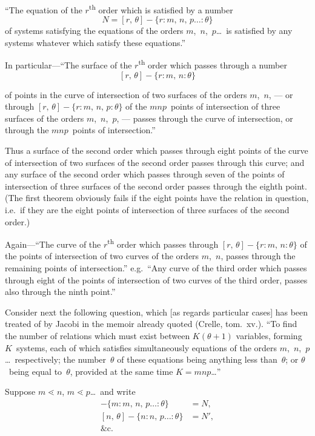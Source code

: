 \documentclass[11pt,a4paper]{book}
\begin{document}
``The equation of the $r$\textsuperscript{th} order which is satisfied by a number
\[
N = [r,\,\theta] - \{r : m,\, n,\, p\ldots : \theta\}
\]
of systems satisfying the equations of the orders $m$,~$n$,~$p$\ldots\ is satisfied by any systems whatever which satisfy these equations.''

In particular---``The surface of the $r$\textsuperscript{th} order which passes through a number
\[
[r,\,\theta] - \{r : m,\, n : \theta\}
\]

\newpage
of points in the curve of intersection of two surfaces of the orders $m$,~$n$, --- or through $[r,\,\theta] - \{r : m,\, n,\, p : \theta\}$ of the $mnp$~points of intersection of three surfaces of the orders $m$,~$n$,~$p$, --- passes through the curve of intersection, or through the $mnp$~points of intersection.''

Thus a surface of the second order which passes through eight points of the curve of intersection of two surfaces of the second order passes through this curve; and any surface of the second order which passes through seven of the points of intersection of three surfaces of the second order passes through the eighth point. (The first theorem obviously fails if the eight points have the relation in question, i.e.~if they are the eight points of intersection of three surfaces of the second order.)

Again---``The curve of the $r$\textsuperscript{th} order which passes through $[r,\,\theta] - \{r : m,\, n : \theta\}$ of the points of intersection of two curves of the orders $m$,~$n$, passes through the remaining points of intersection.'' e.g.~``Any curve of the third order which passes through eight of the points of intersection of two curves of the third order, passes also through the ninth point.''

Consider next the following question, which [as regards particular cases] has been treated of by Jacobi in the memoir already quoted (Crelle, tom.~xv.). ``To find the number of relations which must exist between $K(\theta+1)$ variables, forming $K$~systems, each of which satisfies simultaneously equations of the orders $m$,~$n$,~$p$\ldots\ respectively; the number~$\theta$ of these equations being anything less than~$\theta$; or $\theta$~being equal to~$\theta$, provided at the same time $K = mnp$\ldots''

Suppose $m \lessdot n$, $m \lessdot p$\ldots\ and write
\begin{align*}
[m,\,\theta] - \{m : m,\, n,\, p\ldots : \theta\} &= N,\\
[n,\,\theta] - \{n : n,\, p\ldots : \theta\} &= N',\\
\&\text{c.}
\end{align*}
\end{document}
